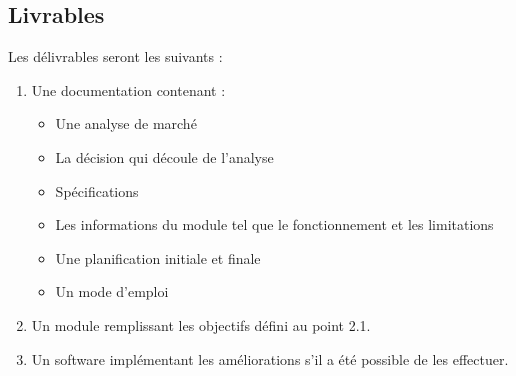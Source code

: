 \subsection*{Livrables}
Les délivrables seront les suivants :
\begin{enumerate}
\item Une documentation contenant :
	\begin{itemize}
	\item Une analyse de marché
	\item La décision qui découle de l’analyse
	\item Spécifications
	\item Les informations du module tel que le fonctionnement et les limitations 
	\item Une planification initiale et finale
	\item Un mode d’emploi
	\end{itemize}
\item Un module remplissant les objectifs défini au point 2.1.
\item Un software implémentant les améliorations s’il a été possible de les effectuer.
\end{enumerate}

